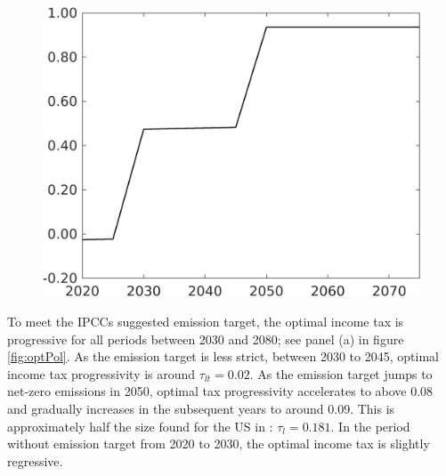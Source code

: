 \begin{figure}[h!!]
\begin{minipage}[]{0.4\textwidth}
		\includegraphics[width=1\textwidth]{../../codding_model/own_basedOnFried/optimalPol_elastS_DisuSci/figures/all_1705/Single_OPT_T_NoTaus_tauf_spillover0_sep1_BN0_ineq0_etaa0.79.png}
	\end{minipage}
\end{figure} 

To meet the IPCCs suggested emission target, the optimal income tax is progressive for all periods between 2030 and 2080; see panel (a) in figure \ref{fig:optPol}. As the emission target is less strict, between 2030 to 2045, optimal income tax progressivity is around $\tau_{lt}=0.02$. As the emission target jumps to net-zero emissions in 2050, optimal tax progressivity accelerates to above 0.08 and gradually increases in the subsequent years to around 0.09. This is approximately half the size found for the US in \cite{Heathcote2017OptimalFramework}: $\tau_{l}=0.181$. 
In the period without emission target from 2020 to 2030, the optimal income tax is slightly regressive.

